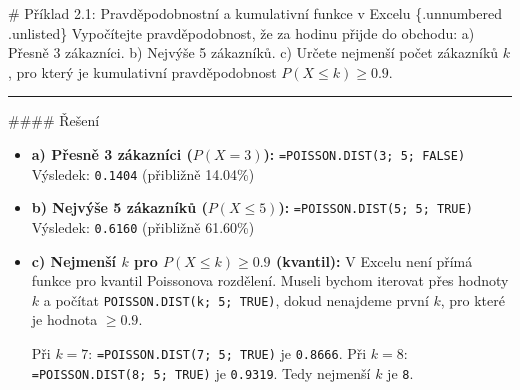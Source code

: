 \documentclass[
  czech,
  11pt,
  letterpaper,
  DIV=11,
  numbers=noendperiod]{scrreprt}
\begin{document}
\begin{tcolorbox}[enhanced jigsaw, arc=.35mm, bottomrule=.15mm, bottomtitle=1mm, breakable, colback=white, colbacktitle=quarto-callout-note-color!10!white, colframe=quarto-callout-note-color-frame, coltitle=black, left=2mm, leftrule=.75mm, opacityback=0, opacitybacktitle=0.6, rightrule=.15mm, title=\textcolor{quarto-callout-note-color}{\faInfo}\hspace{0.5em}{Poznámka}, titlerule=0mm, toprule=.15mm, toptitle=1mm]

\# Příklad 2.1: Pravděpodobnostní a kumulativní funkce v Excelu
\{.unnumbered .unlisted\} Vypočítejte pravděpodobnost, že za hodinu
přijde do obchodu: a) Přesně 3 zákazníci. b) Nejvýše 5 zákazníků. c)
Určete nejmenší počet zákazníků \(k\), pro který je kumulativní
pravděpodobnost \(P(X \le k) \ge 0.9\).

\begin{center}\rule{0.5\linewidth}{0.5pt}\end{center}

\#\#\#\# Řešení

\begin{itemize}
\item
  \textbf{a) Přesně 3 zákazníci (\(P(X=3)\)):}
  \texttt{=POISSON.DIST(3;\ 5;\ FALSE)} Výsledek: \texttt{0.1404}
  (přibližně 14.04\%)
\item
  \textbf{b) Nejvýše 5 zákazníků (\(P(X \le 5)\)):}
  \texttt{=POISSON.DIST(5;\ 5;\ TRUE)} Výsledek: \texttt{0.6160}
  (přibližně 61.60\%)
\item
  \textbf{c) Nejmenší \(k\) pro \(P(X \le k) \ge 0.9\) (kvantil):} V
  Excelu není přímá funkce pro kvantil Poissonova rozdělení. Museli
  bychom iterovat přes hodnoty \(k\) a počítat
  \texttt{POISSON.DIST(k;\ 5;\ TRUE)}, dokud nenajdeme první \(k\), pro
  které je hodnota \(\ge 0.9\).

  Při \(k=7\): \texttt{=POISSON.DIST(7;\ 5;\ TRUE)} je \texttt{0.8666}.
  Při \(k=8\): \texttt{=POISSON.DIST(8;\ 5;\ TRUE)} je \texttt{0.9319}.
  Tedy nejmenší \(k\) je \texttt{8}.
\end{itemize}

\end{tcolorbox}
\end{document}
